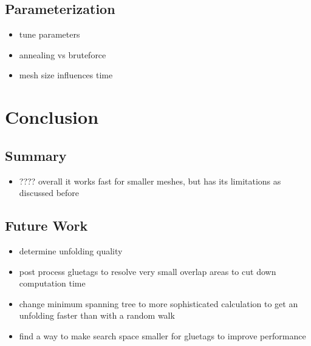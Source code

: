 \documentclass[draft,final]{vutinfth} %
\begin{document}
\section{Parameterization}

\begin{itemize}
	\item tune parameters
	\item annealing vs bruteforce
	\item mesh size influences time
\end{itemize}

\chapter{Conclusion}
\label{chap:conclusion}

\section{Summary}

\begin{itemize}
	\item ???? overall it works fast for smaller meshes, but has its limitations as discussed before
\end{itemize}

\section{Future Work}

\begin{itemize}
	\item determine unfolding quality
	\item post process gluetags to resolve very small overlap areas to cut down computation time
	\item change minimum spanning tree to more sophisticated calculation to get an unfolding faster than with a random walk
	\item find a way to make search space smaller for gluetags to improve performance
\end{itemize}

\backmatter

\listoffigures %

\cleardoublepage %
\listoftables %

\listofalgorithms
{}

\printindex

\printglossaries



\end{document}
